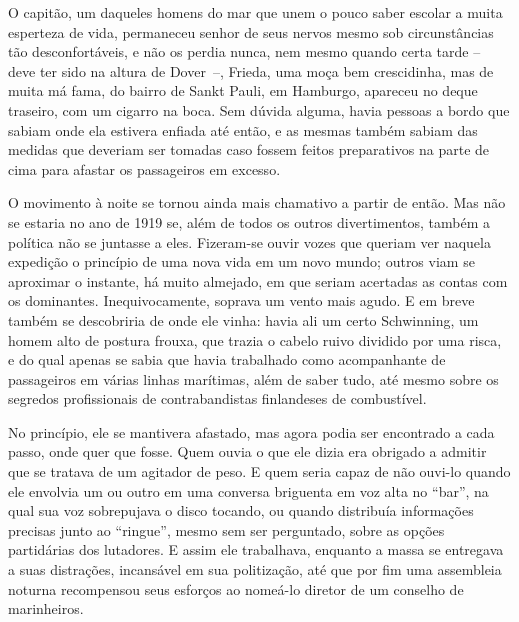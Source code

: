 O capitão, um daqueles homens do mar que unem o pouco saber escolar a
muita esperteza de vida, permaneceu senhor de seus nervos mesmo sob
circunstâncias tão desconfortáveis, e não os perdia nunca, nem mesmo
quando certa tarde -- deve ter sido na altura de \mbox{Dover --,} Frieda, uma
moça bem crescidinha, mas de muita má fama, do bairro de Sankt Pauli, em
Hamburgo, apareceu no deque traseiro, com um cigarro na boca. Sem dúvida
alguma, havia pessoas a bordo que sabiam onde ela estivera enfiada até
então, e as mesmas também sabiam das medidas que deveriam ser tomadas
caso fossem feitos preparativos na parte de cima para afastar os
passageiros em excesso.

O movimento à noite se tornou ainda mais chamativo a partir de então.
Mas não se estaria no ano de 1919 se, além de todos os outros
divertimentos, também a política não se juntasse a eles. Fizeram-se
ouvir vozes que queriam ver naquela expedição o princípio de uma nova
vida em um novo mundo; outros viam se aproximar o instante, há muito
almejado, em que seriam acertadas as contas com os dominantes.
Inequivocamente, soprava um vento mais agudo. E em breve também se
descobriria de onde ele vinha: havia ali um certo Schwinning, um homem
alto de postura frouxa, que trazia o cabelo ruivo dividido por uma
risca, e do qual apenas se sabia que havia trabalhado como acompanhante
de passageiros em várias linhas marítimas, além de saber tudo, até mesmo
sobre os segredos profissionais de contrabandistas finlandeses de
combustível.

No princípio, ele se mantivera afastado, mas agora podia ser encontrado
a cada passo, onde quer que fosse. Quem ouvia o que ele dizia era
obrigado a admitir que se tratava de um agitador de peso. E quem seria
capaz de não ouvi-lo quando ele envolvia um ou outro em uma conversa
briguenta em voz alta no ``bar'', na qual sua voz sobrepujava o disco
tocando, ou quando distribuía informações precisas junto ao ``ringue'',
mesmo sem ser perguntado, sobre as opções partidárias dos lutadores. E
assim ele trabalhava, enquanto a massa se entregava a suas distrações,
incansável em sua politização, até que por fim uma assembleia noturna
recompensou seus esforços ao nomeá-lo diretor de um conselho de
marinheiros.

